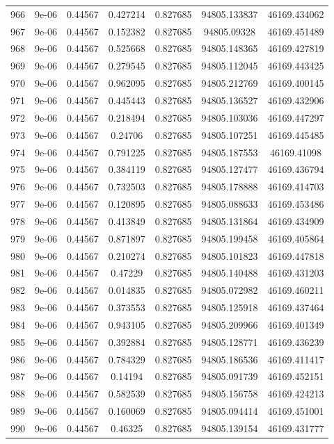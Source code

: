 \begin{table}
\begin{tabular*}{\linewidth}{c|c|c|c|c|c|c}
966 & 9e-06 & 0.44567 & 0.427214 & 0.827685 & 94805.133837 & 46169.434062\\
967 & 9e-06 & 0.44567 & 0.152382 & 0.827685 & 94805.09328 & 46169.451489\\
968 & 9e-06 & 0.44567 & 0.525668 & 0.827685 & 94805.148365 & 46169.427819\\
969 & 9e-06 & 0.44567 & 0.279545 & 0.827685 & 94805.112045 & 46169.443425\\
970 & 9e-06 & 0.44567 & 0.962095 & 0.827685 & 94805.212769 & 46169.400145\\
971 & 9e-06 & 0.44567 & 0.445443 & 0.827685 & 94805.136527 & 46169.432906\\
972 & 9e-06 & 0.44567 & 0.218494 & 0.827685 & 94805.103036 & 46169.447297\\
973 & 9e-06 & 0.44567 & 0.24706 & 0.827685 & 94805.107251 & 46169.445485\\
974 & 9e-06 & 0.44567 & 0.791225 & 0.827685 & 94805.187553 & 46169.41098\\
975 & 9e-06 & 0.44567 & 0.384119 & 0.827685 & 94805.127477 & 46169.436794\\
976 & 9e-06 & 0.44567 & 0.732503 & 0.827685 & 94805.178888 & 46169.414703\\
977 & 9e-06 & 0.44567 & 0.120895 & 0.827685 & 94805.088633 & 46169.453486\\
978 & 9e-06 & 0.44567 & 0.413849 & 0.827685 & 94805.131864 & 46169.434909\\
979 & 9e-06 & 0.44567 & 0.871897 & 0.827685 & 94805.199458 & 46169.405864\\
980 & 9e-06 & 0.44567 & 0.210274 & 0.827685 & 94805.101823 & 46169.447818\\
981 & 9e-06 & 0.44567 & 0.47229 & 0.827685 & 94805.140488 & 46169.431203\\
982 & 9e-06 & 0.44567 & 0.014835 & 0.827685 & 94805.072982 & 46169.460211\\
983 & 9e-06 & 0.44567 & 0.373553 & 0.827685 & 94805.125918 & 46169.437464\\
984 & 9e-06 & 0.44567 & 0.943105 & 0.827685 & 94805.209966 & 46169.401349\\
985 & 9e-06 & 0.44567 & 0.392884 & 0.827685 & 94805.128771 & 46169.436239\\
986 & 9e-06 & 0.44567 & 0.784329 & 0.827685 & 94805.186536 & 46169.411417\\
987 & 9e-06 & 0.44567 & 0.14194 & 0.827685 & 94805.091739 & 46169.452151\\
988 & 9e-06 & 0.44567 & 0.582539 & 0.827685 & 94805.156758 & 46169.424213\\
989 & 9e-06 & 0.44567 & 0.160069 & 0.827685 & 94805.094414 & 46169.451001\\
990 & 9e-06 & 0.44567 & 0.46325 & 0.827685 & 94805.139154 & 46169.431777\\
\end{tabular*}
\end{table}

